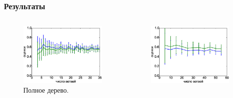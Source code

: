 \documentclass[unicode, notheorems]{beamer}
\begin{document}
\begin{frame}
    \frametitle{Результаты}
    \begin{columns}
        \begin{column}{0.5\textwidth}
            \begin{figure}[h]
                \centering
                \includegraphics[width=\linewidth]{standard_slides}
                \caption{Полное дерево.}
                \label{fig:true_value_test_standard}
            \end{figure}
        \end{column}
        \begin{column}{0.5\textwidth}
            \begin{figure}[h]
                \centering
                \includegraphics[width=\linewidth]{random_subtree_modified_ev_slides}

\end{figure}
\end{column}
\end{columns}
\end{frame}
\end{document}
